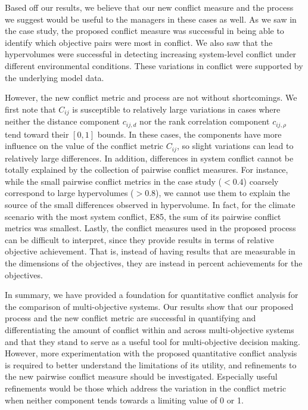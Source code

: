 Based off our results, we believe that our new conflict measure and the process we suggest would be useful to the managers in these cases as well. As we saw in the case study, the proposed conflict measure was successful in being able to identify which objective pairs were most in conflict. We also saw that the hypervolumes were successful in detecting increasing system-level conflict under different environmental conditions. These variations in conflict were supported by the underlying model data. 

However, the new conflict metric and process are not without shortcomings. We first note that $C_{ij}$ is susceptible to relatively large variations in cases where neither the distance component $c_{ij,d}$ nor the rank correlation component $c_{ij,\rho}$ tend toward their $[0,1]$ bounds. In these cases, the components have more influence on the value of the conflict metric $C_{ij}$, so slight variations can lead to relatively large differences. In addition, differences in system conflict cannot be totally explained by the collection of pairwise conflict measures. For instance, while the small pairwise conflict metrics in the case study ($< 0.4$) coarsely correspond to large hypervolumes ($> 0.8$), we cannot use them to explain the source of the small differences observed in hypervolume. In fact, for the climate scenario with the most system conflict, E85, the sum of its pairwise conflict metrics was smallest. Lastly, the conflict measures used in the proposed process can be difficult to interpret, since they provide results in terms of relative objective achievement. That is, instead of having results that are measurable in the dimensions of the objectives, they are instead in percent achievements for the objectives.

In summary, we have provided a foundation for quantitative conflict analysis for the comparison of multi-objective systems. Our results show that our proposed process and the new conflict metric are successful in quantifying and differentiating the amount of conflict within and across multi-objective
systems and that they stand to serve as a useful tool for multi-objective decision making. However, more experimentation with the proposed quantitative conflict analysis is required to better understand the limitations of its utility, and refinements to the new pairwise conflict measure should be investigated. Especially useful refinements would be those which address the variation in the conflict metric when neither component tends towards a limiting value of 0 or 1.